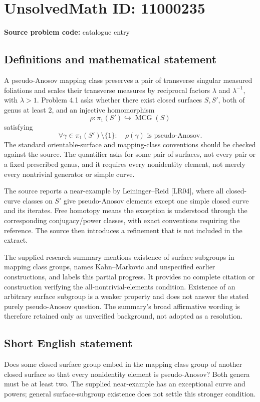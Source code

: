 \documentclass[11pt]{article}
\begin{document}
\section*{UnsolvedMath ID: 11000235}
\textbf{Source problem code:} catalogue entry
\subsection{Definitions and mathematical statement}
A pseudo-Anosov mapping class preserves a pair of transverse singular measured foliations and scales their transverse measures by reciprocal factors \(\lambda\) and \(\lambda^{-1}\), with \(\lambda>1\). Problem 4.1 asks whether there exist closed surfaces \(S,S'\), both of genus at least \(2\), and an injective homomorphism
\[
 \rho:\pi_1(S')\hookrightarrow\operatorname{MCG}(S)
\]
satisfying
\[
 \forall\gamma\in\pi_1(S')\setminus\{1\}:\quad
 \rho(\gamma)\text{ is pseudo-Anosov}.
\]
The standard orientable-surface and mapping-class conventions should be checked against the source. The quantifier asks for some pair of surfaces, not every pair or a fixed prescribed genus, and it requires every nonidentity element, not merely every nontrivial generator or simple curve.

The source reports a near-example by Leininger--Reid [LR04], where all closed-curve classes on \(S'\) give pseudo-Anosov elements except one simple closed curve and its iterates. Free homotopy means the exception is understood through the corresponding conjugacy/power classes, with exact conventions requiring the reference. The source then introduces a refinement that is not included in the extract.

The supplied research summary mentions existence of surface subgroups in mapping class groups, names Kahn--Markovic and unspecified earlier constructions, and labels this partial progress. It provides no complete citation or construction verifying the all-nontrivial-elements condition. Existence of an arbitrary surface subgroup is a weaker property and does not answer the stated purely pseudo-Anosov question. The summary's broad affirmative wording is therefore retained only as unverified background, not adopted as a resolution.
\subsection{Short English statement}
Does some closed surface group embed in the mapping class group of another closed surface so that every nonidentity element is pseudo-Anosov? Both genera must be at least two. The supplied near-example has an exceptional curve and powers; general surface-subgroup existence does not settle this stronger condition.
\end{document}
